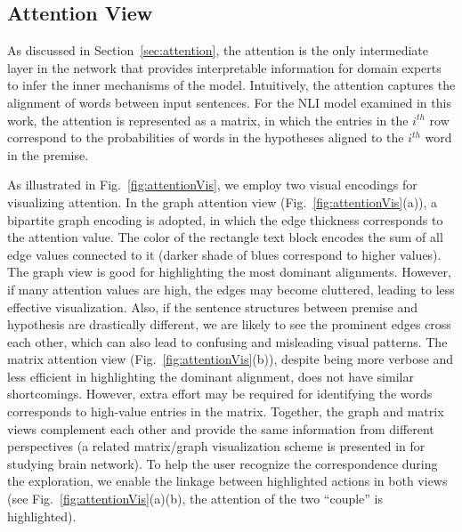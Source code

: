 

\subsection{Attention View}
\label{sec:attentionView}
As discussed in Section~\ref{sec:attention}, the attention is the only intermediate layer in the network that provides interpretable information for domain experts to infer the inner mechanisms of the model.
%
Intuitively, the attention captures the alignment of words between input sentences. For the NLI model examined in this work, the attention is represented as a matrix, in which the entries in the $i^{th}$ row correspond to the probabilities of words in the hypotheses aligned to the $i^{th}$ word in the premise.

As illustrated in Fig.~\ref{fig:attentionVis}, we employ two visual encodings for visualizing attention. In the graph attention view (Fig.~\ref{fig:attentionVis}(a)), a bipartite graph encoding is adopted, in which the edge thickness corresponds to the attention value. The color of the rectangle text block encodes the sum of all edge values connected to it (darker shade of blues correspond to higher values).
%
The graph view is good for highlighting the most dominant alignments. However, if many attention values are high, the edges may become cluttered, leading to less effective visualization. Also, if the sentence structures between premise and hypothesis are drastically different, we are likely to see the prominent edges cross each other, which can also lead to confusing and misleading visual patterns.
%
The matrix attention view (Fig.~\ref{fig:attentionVis}(b)), despite being more verbose and less efficient in highlighting the dominant alignment, does not have similar shortcomings. However, extra effort may be required for identifying the words corresponds to high-value entries in the matrix. Together, the graph and matrix views complement each other and provide the same information from different perspectives (a related matrix/graph visualization scheme is presented in \cite{MaKenyonForbes2015} for studying brain network). 
To help the user recognize the correspondence during the exploration, we enable the linkage between highlighted actions in both views (see Fig.~\ref{fig:attentionVis}(a)(b), the attention of the two ``couple'' is highlighted).


